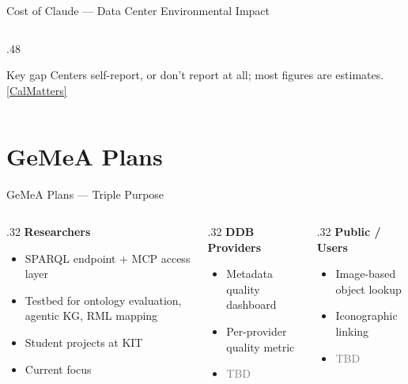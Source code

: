 \documentclass[xcolor,aspectratio=169,compress]{beamer}
\newcommand{\lnk}[2]{\href{#1}{\underline{#2}}}
\begin{document}
\begin{frame}[shrink=5]{Cost of Claude --- Data Center Environmental Impact}
\begin{columns}[t]
\begin{column}{.48\textwidth}
      \medskip
      \begin{alertblock}{\footnotesize Key gap}
        \footnotesize Centers self-report, or don't report at all; most figures are estimates.
        \lnk{https://calmatters.org/environment/2025/11/data-center-environmental-report/}{[CalMatters]}
      \end{alertblock}

    \end{column}
  \end{columns}
\end{frame}

\section{GeMeA Plans}

\begin{frame}{GeMeA Plans --- Triple Purpose}
  \small
  \begin{columns}[t]
    \begin{column}{.32\textwidth}
      \textbf{Researchers}
      \begin{itemize}\setlength{\itemsep}{3pt}
        \item SPARQL endpoint + MCP access layer
        \item Testbed for ontology evaluation, agentic KG, RML mapping
        \item Student projects at KIT
        \item \textcolor{green!60!black}{Current focus}
      \end{itemize}
    \end{column}
    \begin{column}{.32\textwidth}
      \textbf{DDB Providers}
      \begin{itemize}\setlength{\itemsep}{3pt}
        \item Metadata quality dashboard
        \item Per-provider quality metric
        \item \textcolor{gray}{TBD}
      \end{itemize}
    \end{column}
    \begin{column}{.32\textwidth}
      \textbf{Public / Users}
      \begin{itemize}\setlength{\itemsep}{3pt}
        \item Image-based object lookup
        \item Iconographic linking
        \item \textcolor{gray}{TBD}
      \end{itemize}
    \end{column}
  \end{columns}
\end{frame}
\end{document}
